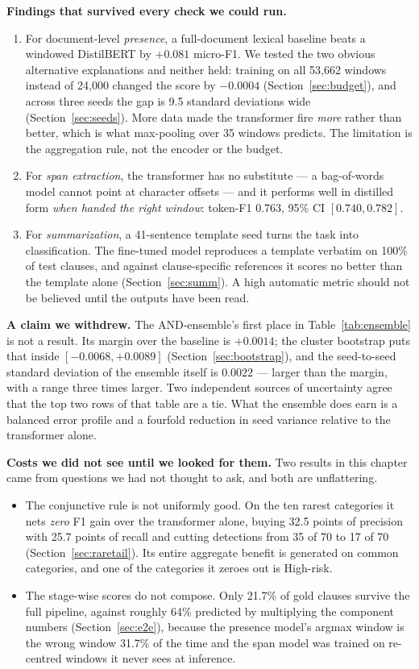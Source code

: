 \textbf{Findings that survived every check we could run.}
\begin{enumerate}[itemsep=2pt]
  \item For document-level \emph{presence}, a full-document lexical baseline beats a windowed DistilBERT by $+0.081$ micro-F1. We tested the two obvious alternative explanations and neither held: training on all 53{,}662 windows instead of 24{,}000 changed the score by $-0.0004$ (Section~\ref{sec:budget}), and across three seeds the gap is 9.5 standard deviations wide (Section~\ref{sec:seeds}). More data made the transformer fire \emph{more} rather than better, which is what max-pooling over 35 windows predicts. The limitation is the aggregation rule, not the encoder or the budget.
  \item For \emph{span extraction}, the transformer has no substitute --- a bag-of-words model cannot point at character offsets --- and it performs well in distilled form \emph{when handed the right window}: token-F1 0.763, 95\% CI $[0.740, 0.782]$.
  \item For \emph{summarization}, a 41-sentence template seed turns the task into classification. The fine-tuned model reproduces a template verbatim on 100\% of test clauses, and against clause-specific references it scores no better than the template alone (Section~\ref{sec:summ}). A high automatic metric should not be believed until the outputs have been read.
\end{enumerate}

\textbf{A claim we withdrew.} The AND-ensemble's first place in Table~\ref{tab:ensemble} is not a result. Its margin over the baseline is $+0.0014$; the cluster bootstrap puts that inside $[-0.0068, +0.0089]$ (Section~\ref{sec:bootstrap}), and the seed-to-seed standard deviation of the ensemble itself is $0.0022$ --- larger than the margin, with a range three times larger. Two independent sources of uncertainty agree that the top two rows of that table are a tie. What the ensemble does earn is a balanced error profile and a fourfold reduction in seed variance relative to the transformer alone.

\textbf{Costs we did not see until we looked for them.} Two results in this chapter came from questions we had not thought to ask, and both are unflattering.
\begin{itemize}[itemsep=2pt]
  \item The conjunctive rule is not uniformly good. On the ten rarest categories it nets \emph{zero} F1 gain over the transformer alone, buying 32.5 points of precision with 25.7 points of recall and cutting detections from 35 of 70 to 17 of 70 (Section~\ref{sec:raretail}). Its entire aggregate benefit is generated on common categories, and one of the categories it zeroes out is High-risk.
  \item The stage-wise scores do not compose. Only 21.7\% of gold clauses survive the full pipeline, against roughly 64\% predicted by multiplying the component numbers (Section~\ref{sec:e2e}), because the presence model's argmax window is the wrong window 31.7\% of the time and the span model was trained on re-centred windows it never sees at inference.
\end{itemize}

